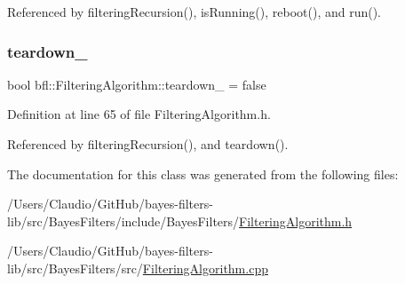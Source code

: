 Referenced by filtering\+Recursion(), is\+Running(), reboot(), and run().

\mbox{\label{classbfl_1_1FilteringAlgorithm_a3bc20cde7fc24767328f8a1ebd3e8cc8}} 
\subsubsection{\texorpdfstring{teardown\+\_\+}{teardown\_}}
{\footnotesize\ttfamily bool bfl\+::\+Filtering\+Algorithm\+::teardown\+\_\+ = false\hspace{0.3cm}{\ttfamily [private]}}



Definition at line 65 of file Filtering\+Algorithm.\+h.



Referenced by filtering\+Recursion(), and teardown().



The documentation for this class was generated from the following files\+:\begin{DoxyCompactItemize}
\item 
/\+Users/\+Claudio/\+Git\+Hub/bayes-\/filters-\/lib/src/\+Bayes\+Filters/include/\+Bayes\+Filters/\mbox{\hyperlink{FilteringAlgorithm_8h}{Filtering\+Algorithm.\+h}}\item 
/\+Users/\+Claudio/\+Git\+Hub/bayes-\/filters-\/lib/src/\+Bayes\+Filters/src/\mbox{\hyperlink{FilteringAlgorithm_8cpp}{Filtering\+Algorithm.\+cpp}}\end{DoxyCompactItemize}
